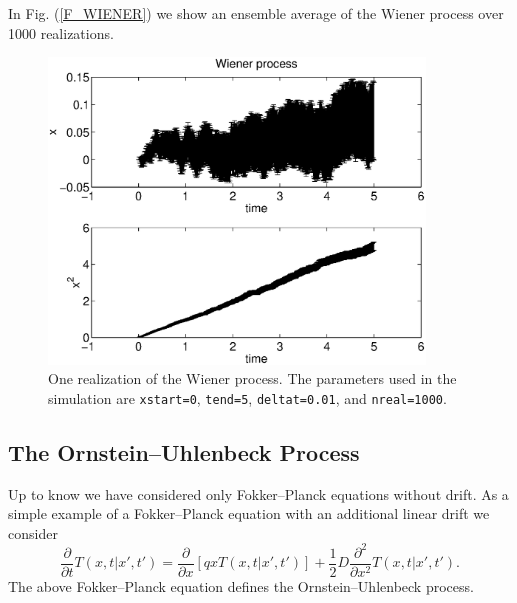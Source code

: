 In Fig. (\ref{F_WIENER}) we show an ensemble average of the
Wiener process over 1000 realizations.
\begin{figure}
\label{F_WIENER_R1}
\includegraphics[width=10cm]{./Figures/f_wiener.eps}
\caption{One realization of the Wiener process.
The parameters used in the simulation are \texttt{xstart=0},
\texttt{tend=5}, \texttt{deltat=0.01}, and \texttt{nreal=1000}.}
\end{figure}

\subsection{The Ornstein--Uhlenbeck Process}
Up to know we have considered only Fokker--Planck equations 
without drift. 
As a simple example of a Fokker--Planck equation with an 
additional linear drift we consider
\begin{equation}
\label{ORNSTEIN}
\frac{\partial}{\partial t} T(x,t|x',t') = 
\frac{\partial}{\partial x} [qx T(x,t|x',t')] 
+ \frac{1}{2} D \frac{\partial^2}{\partial x^2} T(x,t|x',t').
\end{equation}
The above Fokker--Planck equation defines the Ornstein--Uhlenbeck
process. 

